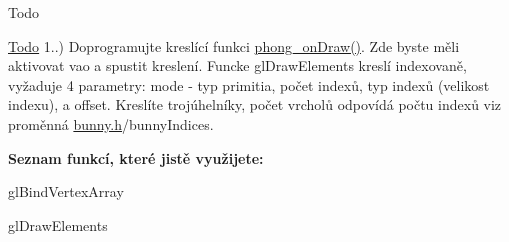 \begin{DoxyRefDesc}{Todo}
\item[\hyperlink{todo__todo000008}{Todo}]1..) Doprogramujte kreslící funkci \hyperlink{student_8h_a53ffbb1a271d285abdaf7a029192f47e}{phong\-\_\-on\-Draw()}. Zde byste měli aktivovat vao a spustit kreslení. Funcke gl\-Draw\-Elements kreslí indexovaně, vyžaduje 4 parametry\-: mode -\/ typ primitia, počet indexů, typ indexů (velikost indexu), a offset. Kreslíte trojúhelníky, počet vrcholů odpovídá počtu indexů viz proměnná \hyperlink{bunny_8h}{bunny.\-h}/bunny\-Indices.\par
 {\bfseries Seznam funkcí, které jistě využijete\-:}
\begin{DoxyItemize}
\item gl\-Bind\-Vertex\-Array
\item gl\-Draw\-Elements 
\end{DoxyItemize}\end{DoxyRefDesc}
